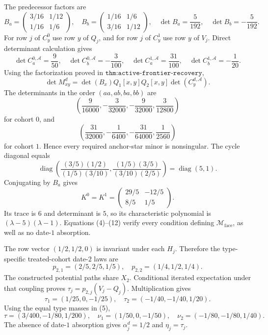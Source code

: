 The predecessor factors are
\[
 B_a=\begin{pmatrix}3/16&1/12\\1/16&1/6\end{pmatrix},\quad
 B_b=\begin{pmatrix}1/16&1/6\\3/16&1/12\end{pmatrix},
 \quad
 \det B_a=\frac5{192},\quad \det B_b=-\frac5{192}.
\tag{6}
\]
For row \(j\) of \(C_y^0\) use row \(y\) of \(Q_j\), and for row \(j\) of \(C_y^1\) use row \(y\) of \(V_j\).  Direct determinant calculation gives
\[
 \det C_a^{0,\mathcal A}=\frac9{50},\quad
 \det C_b^{0,\mathcal A}=-\frac3{100},\quad
 \det C_a^{1,\mathcal A}=\frac{31}{100},\quad
 \det C_b^{1,\mathcal A}=-\frac1{20}.
\tag{7}
\]
Using the factorization proved in \(\texttt{thm:active-frontier-recovery}\),
\[
 \det M_{xy}^d=\det(B_x)Q_1[x,y]Q_2[x,y]\det(C_y^{d,\mathcal A}).
\tag{8}
\]
The determinants in the order \((aa,ab,ba,bb)\) are
\[
 \left(\frac9{16000},-\frac3{32000},-\frac9{32000},\frac3{12800}\right)
\tag{9}
\]
for cohort \(0\), and
\[
 \left(\frac{31}{32000},-\frac1{6400},-\frac{31}{64000},\frac1{2560}\right)
\tag{10}
\]
for cohort \(1\).  Hence every required anchor-star minor is nonsingular.  The cycle diagonal equals
\[
 \operatorname{diag}\!\left(
 \frac{(3/5)(1/2)}{(1/5)(3/10)},
 \frac{(1/5)(3/5)}{(3/10)(2/5)}\right)
 =\operatorname{diag}(5,1).
\tag{11}
\]
Conjugating by \(B_a\) gives
\[
 K^0=K^1=\begin{pmatrix}29/5&-12/5\\8/5&1/5\end{pmatrix}.
\tag{12}
\]
Its trace is \(6\) and determinant is \(5\), so its characteristic polynomial is \((\lambda-5)(\lambda-1)\).  Equations (4)--(12) verify every condition defining \(\mathcal M_{\mathrm{face}}\), as well as no date-\(1\) absorption.

The row vector \((1/2,1/2,0)\) is invariant under each \(H_j\).  Therefore the type-specific treated-cohort date-\(2\) laws are
\[
 p_{2,1}=(2/5,2/5,1/5),\quad
 p_{2,2}=(1/4,1/2,1/4).
\tag{13}
\]
The constructed potential paths share \(X_2\).  Conditional iterated expectation under that coupling proves \(\tau_j=p_{2,j}(V_j-Q_j)\).  Multiplication gives
\[
 \tau_1=(1/25,0,-1/25),\quad
 \tau_2=(-1/40,-1/40,1/20).
\tag{14}
\]
Using the equal type masses in (5),
\[
 \tau=(3/400,-1/80,1/200),\quad
 \nu_1=(1/50,0,-1/50),\quad
 \nu_2=(-1/80,-1/80,1/40).
\tag{15}
\]
The absence of date-\(1\) absorption gives \(\alpha_j^d=1/2\) and \(\eta_j=\tau_j\).

